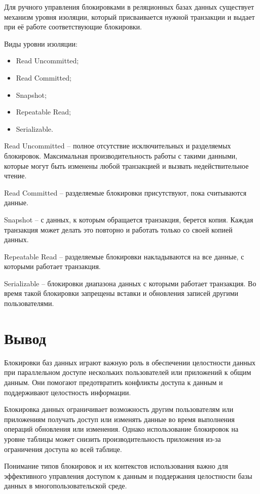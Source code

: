 Для ручного управления блокировками в реляционных базах данных существует механизм уровня изоляции, который присваивается нужной транзакции и выдает при её работе соответствующие блокировки\cite{isolation}.

Виды уровни изоляции:
\begin{itemize}
	\item Read Uncommitted;
	\item Read Committed;
	\item Snapshot;
	\item Repeatable Read;
	\item Serializable.
\end{itemize}

Read Uncommitted -- полное отсутствие исключительных и разделяемых блокировок. Максимальная производительность работы с такими данными, которые могут быть изменены любой транзакцией и вызвать недействительное чтение.

Read Committed -- разделяемые блокировки присутствуют, пока считываются данные. 

Snapshot -- с данных, к которым обращается транзакция, берется копия. Каждая транзакция может делать это повторно и работать только со своей копией данных.

Repeatable Read -- разделяемые блокировки накладываются на все данные, с которыми работает транзакция.

Serializable -- блокировки диапазона данных с которыми работает транзакция. Во время такой блокировки запрещены вставки и обновления записей другими пользователями.

\section*{Вывод}

Блокировки баз данных играют важную роль в обеспечении целостности данных при параллельном доступе нескольких пользователей или приложений к общим данным.
Они помогают предотвратить конфликты доступа к данным и поддерживают целостность информации.

Блокировка данных ограничивает возможность другим пользователям или приложениям получать доступ или изменять данные во время выполнения операций обновления или изменения. 
Однако использование блокировок на уровне таблицы может снизить производительность приложения из-за ограничения доступа ко всей таблице.

Понимание типов блокировок и их контекстов использования важно для эффективного управления доступом к данным и поддержания целостности базы данных в многопользовательской среде.

